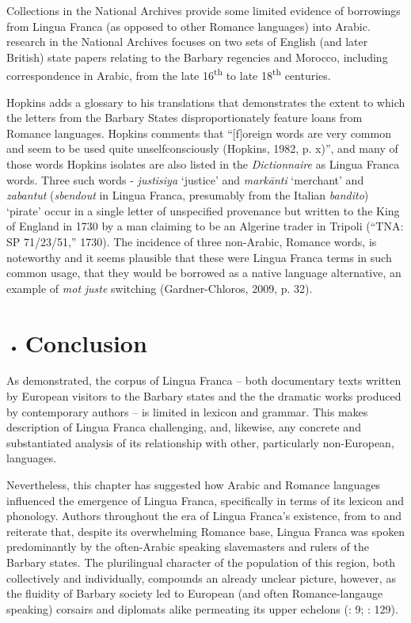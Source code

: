 \documentclass[output=paper]{langsci/langscibook}
\begin{document}
Collections in the National Archives provide some limited evidence of borrowings from Lingua Franca (as opposed to other Romance languages) into Arabic.  research in the National Archives focuses on two sets of English (and later British) state papers relating to the Barbary regencies and Morocco, including correspondence in Arabic, from the late 16\textsuperscript{th} to late 18\textsuperscript{th} centuries. 

Hopkins adds a glossary to his translations that demonstrates the extent to which the letters from the Barbary States disproportionately feature loans from Romance languages. Hopkins comments that “[f]oreign words are very common and seem to be used quite unselfconsciously (Hopkins, 1982, p. x)”, and many of those words Hopkins isolates are also listed in the \textit{Dictionnaire}  as Lingua Franca words. Three such words - \textit{justisiya} ‘justice’ and \textit{markānti} ‘merchant’ and \textit{zabantut} (\textit{sbendout} in Lingua Franca, presumably from the Italian \textit{bandito}) ‘pirate’ occur in a single letter of unspecified provenance but written to the King of England in 1730 by a man claiming to be an Algerine trader in Tripoli (“TNA: SP 71/23/51,” 1730). The incidence of three non-Arabic, Romance words, is noteworthy and it seems plausible that these were Lingua Franca terms in such common usage, that they would be borrowed as a native language alternative, an example of \textit{mot} \textit{juste} switching (Gardner-Chloros, 2009, p. 32).

\begin{itemize}
	\item \section{Conclusion}
\end{itemize}

As demonstrated, the corpus of Lingua Franca – both documentary texts written by European visitors to the Barbary states and the the dramatic works produced by contemporary authors – is limited in lexicon and grammar. This makes description of Lingua Franca challenging, and, likewise, any concrete and substantiated analysis of its relationship with other, particularly non-European, languages.

Nevertheless, this chapter has suggested how Arabic and Romance languages influenced the emergence of Lingua Franca, specifically in terms of its lexicon and phonology. Authors throughout the era of Lingua Franca’s existence, from \citet{Haedo1612} to \citet{Broughton1839} and \citet{Frank1850} reiterate that, despite its overwhelming Romance base, Lingua Franca was spoken predominantly by the often-Arabic speaking slavemasters and rulers of the Barbary states. The plurilingual character of the population of this region, both collectively and individually, compounds an already unclear picture, however, as the fluidity of Barbary society led to European (and often Romance-langauge speaking) corsairs and diplomats alike permeating its upper echelons (\citealt{Haedo1612}: 9; \citealt{Garcès2011}: 129).
\end{document}
